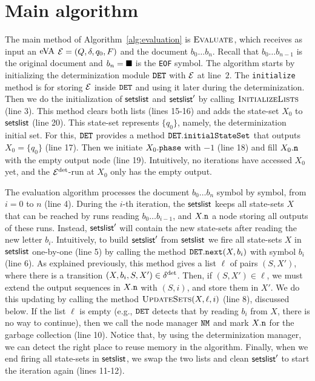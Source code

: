 \section{Main algorithm}
The main method of Algorithm~\ref{alg:evaluation} is $\textproc{Evaluate}$,
which receives as input an $\mathrm{eVA}$ $\mathcal{E} = (Q,\delta,q_0,F)$ and the document $b_0
\ldots b_{n}$. Recall that $b_0 \ldots b_{n-1}$ is the original document and
$b_n = \blacksquare$ is the \texttt{EOF} symbol. The algorithm starts by
initializing the determinization module $\mathtt{DET}$ with $\mathcal{E}$ at line~$2$. The
\texttt{initialize} method is for storing $\mathcal{E}$ inside $\mathtt{DET}$ and using it
later during the determinization. Then we do the initialization of
$\textsf{setslist}$ and $\textsf{setslist}'$ by calling $\textproc{InitializeLists}$
(line 3). This method clears both lists (lines 15-16) and adds the state-set
$X_0$ to $\textsf{setslist}$ (line 20). This state-set represents $\{q_0\}$, namely,
the determinization initial set. For this, $\mathtt{DET}$ provides a method
$\mathtt{DET}.\texttt{initialStateSet}$ that outputs $X_0 = \{q_0\}$ (line 17). Then we
initiate $X_0.\texttt{phase}$ with $-1$ (line 18) and fill $X_0.\mathtt{n}$ with the empty
output node (line 19). Intuitively, no iterations have accessed $X_0$ yet, and
the $\mathcal{E}^{{\operatorname{det}}}$-run at $X_0$ only has the empty output.

The evaluation algorithm processes the document $b_0 \ldots b_{n}$ symbol by
symbol, from $i=0$ to $n$ (line 4). During the $i$-th iteration, the
$\textsf{setslist}$ keeps all state-sets $X$ that can be reached by runs reading
$b_0\ldots b_{i-1}$, and $X.\mathtt{n}$ a node storing all outputs of these runs.
Instead, $\textsf{setslist}'$ will contain the new state-sets after reading the new
letter $b_i$. Intuitively, to build $\textsf{setslist}'$ from $\textsf{setslist}$ we
fire all state-sets $X$ in $\textsf{setslist}$ one-by-one (line 5) by calling the
method $\mathtt{DET}.\texttt{next}(X,b_i)$ with symbol $b_i$ (line 6). As explained
previously, this method gives a list $\ell$ of pairs $(S, X')$, where there is a
transition $(X, b_i, S, X') \in \delta^{{\operatorname{det}}}$. Then, if $(S, X') \in \ell$, we
must extend the output sequences in $X.\mathtt{n}$ with $(S, i)$, and store them in
$X'$. We do this updating by calling the method
$\textproc{UpdateSets}(X,\ell,i)$ (line 8), discussed below. If the list $\ell$
is empty (e.g., $\mathtt{DET}$ detects that by reading $b_i$ from $X$, there is no way
to continue), then we call the node manager $\mathtt{NM}$ and mark $X.\mathtt{n}$ for the
garbage collection (line 10). Notice that, by using the determinization manager,
we can detect the right place to reuse memory in the algorithm. Finally, when we
end firing all state-sets in $\textsf{setslist}$, we swap the two lists and clean
$\textsf{setslist}'$ to start the iteration again (lines 11-12).

